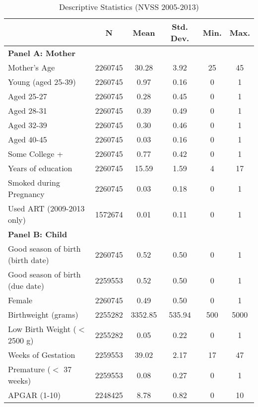 \documentclass[a4paper, 12 pt]{article}
\theoremstyle{plain}
\begin{document}
\begin{doublespace}
\begin{table}[htpb!]
 \begin{center}
\caption{Descriptive Statistics (NVSS 2005-2013)}
 \label{bqTab:SumStatsMain}\begin{tabular}{lccccc}
 \toprule\toprule \vspace{5mm}
& N & Mean & Std. Dev. & Min. & Max. \\ \midrule
\multicolumn{6}{l}{\textbf{Panel A: Mother}} \\
Mother's Age        &     2260745&       30.28&        3.92&          25&          45\\
Young (aged 25-39)  &     2260745&        0.97&        0.16&           0&           1\\
Aged 25-27          &     2260745&        0.28&        0.45&           0&           1\\
Aged 28-31          &     2260745&        0.39&        0.49&           0&           1\\
Aged 32-39          &     2260745&        0.30&        0.46&           0&           1\\
Aged 40-45          &     2260745&        0.03&        0.16&           0&           1\\
Some College +&     2260745&        0.77&        0.42&           0&           1\\
Years of education  &     2260745&       15.59&        1.59&           4&          17\\
Smoked during Pregnancy&     2260745&        0.03&        0.18&           0&           1\\
Used ART (2009-2013 only)&     1572674&        0.01&        0.11&           0&           1\\

 \multicolumn{6}{l}{\textbf{Panel B: Child}}\\
 Good season of birth (birth date)&     2260745&        0.52&        0.50&           0&           1\\
Good season of birth (due date)&     2259553&        0.52&        0.50&           0&           1\\
Female              &     2260745&        0.49&        0.50&           0&           1\\
Birthweight (grams) &     2255282&     3352.85&      535.94&         500&        5000\\
Low Birth Weight ($<$2500 g)&     2255282&        0.05&        0.22&           0&           1\\
Weeks of Gestation  &     2259553&       39.02&        2.17&          17&          47\\
Premature ($<$ 37 weeks)&     2259553&        0.08&        0.27&           0&           1\\
APGAR (1-10)        &     2248425&        8.78&        0.82&           0&          10\\


\end{tabular}
\end{center}
\end{table}
\end{doublespace}
\end{document}
